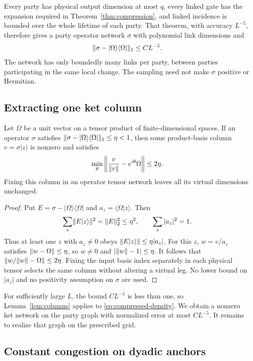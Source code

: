 Every party has physical output dimension at most $q$, every linked gate
has the expansion required in Theorem~\ref{thm:compression}, and linked
incidence is bounded over the whole lifetime of each party.
That theorem, with accuracy $L^{-5}$, therefore gives a party operator
network $\sigma$ with polynomial link dimensions and
\begin{equation}\label{eq:compressed-density}
 \lVert \sigma-|\Omega\rangle\langle\Omega|\rVert_1\le CL^{-5}.
\end{equation}
The network has only boundedly many links per party, between parties
participating in the same local change. The sampling need not make
$\sigma$ positive or Hermitian.

\subsection{Extracting one ket column}

\begin{lemma}\label{lem:columns}
Let $\Omega$ be a unit vector on a tensor product of finite-dimensional
spaces. If an operator $\sigma$ satisfies
$\lVert \sigma-|\Omega\rangle\langle\Omega|\rVert_1\le\eta<1$, then some
product-basis column $v=\sigma|z\rangle$ is nonzero and satisfies
\[
 \min_\theta\left\|\frac{v}{\lVert v\rVert}-e^{i\theta}\Omega\right\|
 \le2\eta.
\]
Fixing this column in an operator tensor network leaves all its virtual
dimensions unchanged.
\end{lemma}
\begin{proof}
Put $E=\sigma-|\Omega\rangle\langle\Omega|$ and
$a_z=\langle\Omega|z\rangle$. Then
\[
 \sum_z\lVert E|z\rangle\rVert^2=\lVert E\rVert_2^2\le\eta^2,
 \qquad \sum_z|a_z|^2=1.
\]
Thus at least one $z$ with $a_z\ne0$ obeys
$\lVert E|z\rangle\rVert\le\eta|a_z|$. For this $z$,
$w=v/a_z$ satisfies $\lVert w-\Omega\rVert\le\eta$, so $w\ne0$ and
$|\lVert w\rVert-1|\le\eta$. It follows that
$\lVert w/\lVert w\rVert-\Omega\rVert\le2\eta$.
Fixing the input basis index separately in each physical tensor selects
the same column without altering a virtual leg. No lower bound on
$|a_z|$ and no positivity assumption on $\sigma$ are used.
\end{proof}

For sufficiently large $L$, the bound $CL^{-5}$ is less than one, so
Lemma~\ref{lem:columns} applies to \eqref{eq:compressed-density}. We obtain a
nonzero ket network on the party graph with normalized error at most
$CL^{-5}$. It remains to realize that graph on the prescribed grid.

\subsection{Constant congestion on dyadic anchors}

